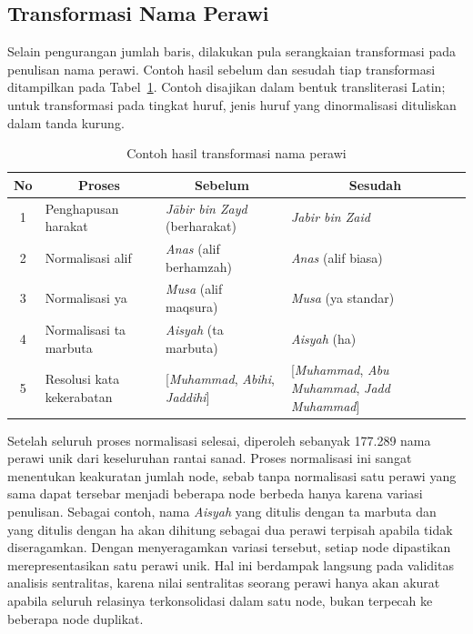 \subsection{Transformasi Nama Perawi}
\label{subsec:transformasi-nama}
Selain pengurangan jumlah baris, dilakukan pula serangkaian transformasi pada penulisan nama perawi. Contoh hasil sebelum dan sesudah tiap transformasi ditampilkan pada Tabel~\ref{tab:transformasi-nama}. Contoh disajikan dalam bentuk transliterasi Latin; untuk transformasi pada tingkat huruf, jenis huruf yang dinormalisasi dituliskan dalam tanda kurung.

\begin{table}[H]
\centering
\caption{Contoh hasil transformasi nama perawi}
\label{tab:transformasi-nama}
\renewcommand{\arraystretch}{1.3}
\begin{tabular}{|c|p{3.3cm}|p{4.3cm}|p{5cm}|}
\hline
\multicolumn{1}{|c|}{\textbf{No}} & \multicolumn{1}{c|}{\textbf{Proses}} & \multicolumn{1}{c|}{\textbf{Sebelum}} & \multicolumn{1}{c|}{\textbf{Sesudah}} \\
\hline
1 & Penghapusan harakat & \textit{J\=abir bin Zayd} (berharakat) & \textit{Jabir bin Zaid} \\
\hline
2 & Normalisasi alif & \textit{Anas} (alif berhamzah) & \textit{Anas} (alif biasa) \\
\hline
3 & Normalisasi ya & \textit{Musa} (alif maqsura) & \textit{Musa} (ya standar) \\
\hline
4 & Normalisasi ta marbuta & \textit{Aisyah} (ta marbuta) & \textit{Aisyah} (ha) \\
\hline
5 & Resolusi kata kekerabatan & [\textit{Muhammad}, \textit{Abihi}, \textit{Jaddihi}] & [\textit{Muhammad}, \textit{Abu Muhammad}, \textit{Jadd Muhammad}] \\
\hline
\end{tabular}
\end{table}

Setelah seluruh proses normalisasi selesai, diperoleh sebanyak 177.289 nama perawi unik dari keseluruhan rantai sanad. Proses normalisasi ini sangat menentukan keakuratan jumlah node, sebab tanpa normalisasi satu perawi yang sama dapat tersebar menjadi beberapa node berbeda hanya karena variasi penulisan. Sebagai contoh, nama \textit{Aisyah} yang ditulis dengan ta marbuta dan yang ditulis dengan ha akan dihitung sebagai dua perawi terpisah apabila tidak diseragamkan. Dengan menyeragamkan variasi tersebut, setiap node dipastikan merepresentasikan satu perawi unik. Hal ini berdampak langsung pada validitas analisis sentralitas, karena nilai sentralitas seorang perawi hanya akan akurat apabila seluruh relasinya terkonsolidasi dalam satu node, bukan terpecah ke beberapa node duplikat.


